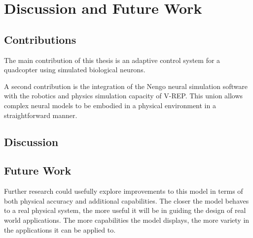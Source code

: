 \documentclass[letterpaper,12pt,titlepage,oneside,final]{book}
\begin{document}
\chapter{Discussion and Future Work} \label{chap:discussion}

\section{Contributions}


The main contribution of this thesis is an adaptive control system for a quadcopter using simulated biological neurons.

A second contribution is the integration of the Nengo neural simulation software with the robotics and physics simulation capacity of V-REP.
This union allows complex neural models to be embodied in a physical environment in a straightforward manner. 

\section{Discussion}

\section{Future Work}

Further research could usefully explore improvements to this model in terms of both physical accuracy and additional capabilities.
The closer the model behaves to a real physical system, the more useful it will be in guiding the design of real world applications.
The more capabilities the model displays, the more variety in the applications it can be applied to.
\end{document}
